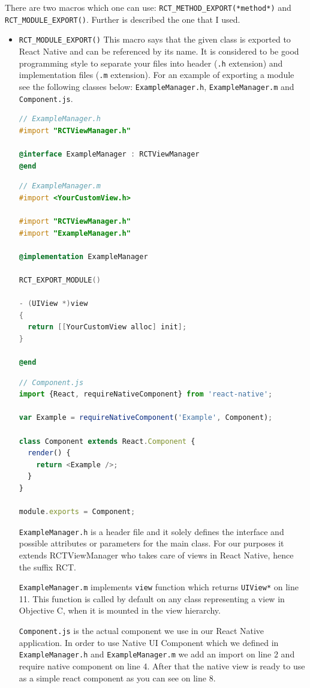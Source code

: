 \documentclass[thesis=M,english]{FITthesis}[2012/10/20]
\begin{document}
There are two macros which one can use:  \verb|RCT_METHOD_EXPORT(*method*)| and \verb|RCT_MODULE_EXPORT()|. Further is described the one that I used.

\begin{itemize}
\item  \verb|RCT_MODULE_EXPORT()| 
This macro says that the given class is exported to React Native and can be referenced by its name. It is considered to be good programming style to separate your files into header (\verb|.h| extension) and implementation files (\verb|.m| extension). For an example of exporting a module see the following classes below: \verb|ExampleManager.h|, \verb|ExampleManager.m| and \verb|Component.js|.


\begin{lstlisting}[language=C]
// ExampleManager.h
#import "RCTViewManager.h"

@interface ExampleManager : RCTViewManager
@end

\end{lstlisting}

\begin{lstlisting}[language=C]
// ExampleManager.m
#import <YourCustomView.h>

#import "RCTViewManager.h"
#import "ExampleManager.h"

@implementation ExampleManager

RCT_EXPORT_MODULE()

- (UIView *)view
{
  return [[YourCustomView alloc] init];
}

@end
\end{lstlisting}

\begin{lstlisting}[language=javascript]
// Component.js
import {React, requireNativeComponent} from 'react-native';

var Example = requireNativeComponent('Example', Component);

class Component extends React.Component {
  render() {
    return <Example />;
  }
}

module.exports = Component;
\end{lstlisting}
  
  \verb|ExampleManager.h| is a header file and it solely defines the interface and possible attributes or parameters for the main class. For our purposes it extends RCTViewManager who takes care of views in React Native, hence the suffix RCT.
  
  \verb|ExampleManager.m| implements \verb|view| function which returns \verb|UIView*| on line 11. This function is called by default on any class representing a view in Objective C, when it is mounted in the view hierarchy.
  
  \verb|Component.js| is the actual component we use in our React Native application. In order to use Native UI Component which we defined in  \verb|ExampleManager.h| and \verb|ExampleManager.m| we add an import on line 2 and require native component on line 4. After that the native view is ready to use as a simple react component as you can see on line 8.
  

\end{itemize}
\end{document}
